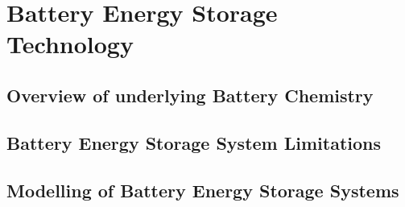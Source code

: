 \section{Battery Energy Storage Technology}
\label{ch-review:sec:battery-energy-storage-technology}

\subsection{Overview of underlying Battery Chemistry}

\subsection{Battery Energy Storage System Limitations}

\subsection{Modelling of Battery Energy Storage Systems}